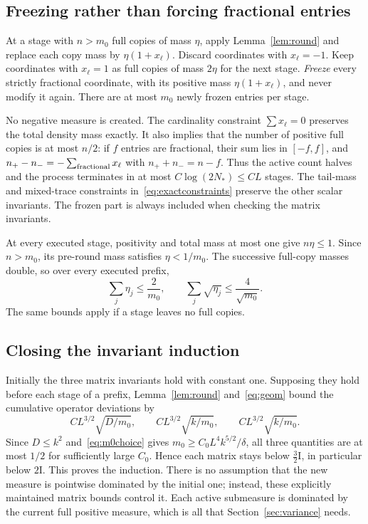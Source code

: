 \documentclass[11pt]{article}
\theoremstyle{remark}\newtheorem{remark}[theorem]{Remark}
\newcommand{\Id}{\mathrm I}\newcommand{\dbar}{\bar d}
\numberwithin{equation}{section}
\begin{document}
\subsection{Freezing rather than forcing fractional entries}
At a stage with $n>m_0$ full copies of mass $\eta$, apply Lemma~\ref{lem:round} and replace each copy mass by $\eta(1+x_\ell)$. Discard coordinates with $x_\ell=-1$. Keep coordinates with $x_\ell=1$ as full copies of mass $2\eta$ for the next stage. \emph{Freeze} every strictly fractional coordinate, with its positive mass $\eta(1+x_\ell)$, and never modify it again. There are at most $m_0$ newly frozen entries per stage.

No negative measure is created. The cardinality constraint $\sum x_\ell=0$ preserves the total density mass exactly. It also implies that the number of positive full copies is at most $n/2$: if $f$ entries are fractional, their sum lies in $[-f,f]$, and
$n_+-n_-=-\sum_{\rm fractional}x_\ell$ with $n_++n_-=n-f$.
Thus the active count halves and the process terminates in at most $C\log(2N_*)\le CL$ stages. The tail-mass and mixed-trace constraints in~\eqref{eq:exactconstraints} preserve the other scalar invariants. The frozen part is always included when checking the matrix invariants.

At every executed stage, positivity and total mass at most one give $n\eta\le1$. Since $n>m_0$, its pre-round mass satisfies $\eta<1/m_0$. The successive full-copy masses double, so over every executed prefix,
\begin{equation}\label{eq:geom}
 \sum_j\eta_j\le\frac2{m_0},\qquad
 \sum_j\sqrt{\eta_j}\le\frac4{\sqrt{m_0}}.
\end{equation}
The same bounds apply if a stage leaves no full copies.

\subsection{Closing the invariant induction}
Initially the three matrix invariants hold with constant one. Supposing they hold before each stage of a prefix, Lemma~\ref{lem:round} and~\eqref{eq:geom} bound the cumulative operator deviations by
\begin{equation}\label{eq:statdrift}
 CL^{3/2}\sqrt{D/m_0},\qquad CL^{3/2}\sqrt{k/m_0},\qquad CL^{3/2}\sqrt{k/m_0}.
\end{equation}
Since $D\le k^2$ and~\eqref{eq:m0choice} gives $m_0\ge C_0L^4k^{5/2}/\delta$, all three quantities are at most $1/2$ for sufficiently large $C_0$. Hence each matrix stays below $\tfrac32\Id$, in particular below $2\Id$. This proves the induction. There is no assumption that the new measure is pointwise dominated by the initial one; instead, these explicitly maintained matrix bounds control it. Each active submeasure is dominated by the current full positive measure, which is all that Section~\ref{sec:variance} needs.
\end{document}
